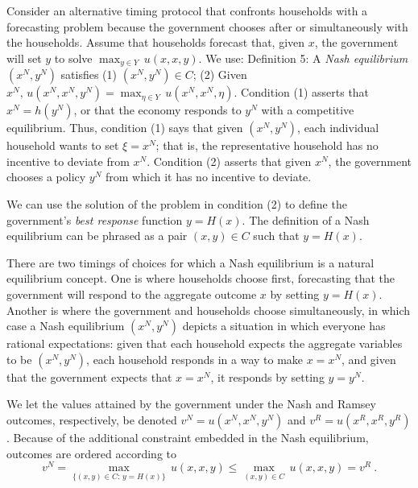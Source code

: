 Consider an alternative timing protocol that confronts  households with  a
forecasting problem because the government chooses after or simultaneously
with the households.   Assume that households forecast that, given $x$, the government
will set $y$ to solve $\max_{y\in Y}\, u(x,x,y)$.  We use:
\medskip\noindent
{\sc Definition 5:}  A {\it Nash equilibrium} $(x^N, y^N)$ satisfies
\smallskip
\noindent (1) $(x^N,y^N)\in C$;
\smallskip
\noindent (2) Given $x^N,\, u(x^N,x^N,y^N)=\max_{\eta\in Y}\,
u(x^N,x^N,\eta)$.
\medskip\noindent
Condition (1) asserts that $x^N = h(y^N)$, or that the economy responds
to $y^N$ with a competitive equilibrium.  Thus,
condition  (1) says that given $(x^N, y^N)$, each
individual household wants to set $\xi=x^N$; that is, the representative household
has no incentive to deviate from $x^N$.  Condition (2) asserts that
given $x^N$, the government chooses a policy $y^N$ from which it has no
incentive to deviate.

\newpage

We can use the solution of the problem in condition (2) to define
the government's {\it best response\/} function $y=H(x)$.
The definition  of a Nash equilibrium can be phrased
as a pair $(x,y) \in C$ such that $y=H(x)$.


There are two timings of choices for which a Nash equilibrium
is a natural equilibrium concept.  One is where
households choose first, forecasting that the government will
respond to the aggregate outcome $x$ by setting $y=H(x)$.  Another
is where the government and households choose simultaneously,
in which case a Nash equilibrium $(x^N,y^N)$ depicts a situation
in which everyone has rational expectations:  given that
each household expects the aggregate variables to be $(x^N,y^N)$,
each household responds in a way to make $x=x^N$, and given that
the government expects that $x=x^N$, it responds by setting $y=y^N$.

We let the values attained by the government under the Nash and Ramsey outcomes, respectively, be denoted $v^N = u(x^N,x^N,y^N)$ and $v^R= u(x^R,x^R,y^R)$.
Because of the additional constraint
embedded in the Nash equilibrium, outcomes are ordered according to
$$v^N = \max_{\{(x,y)\in C:\, y=H(x)\}}\, u(x,x,y)
      \leq \max_{(x,y)\in C}\, u(x,x,y) = v^R\ .$$

